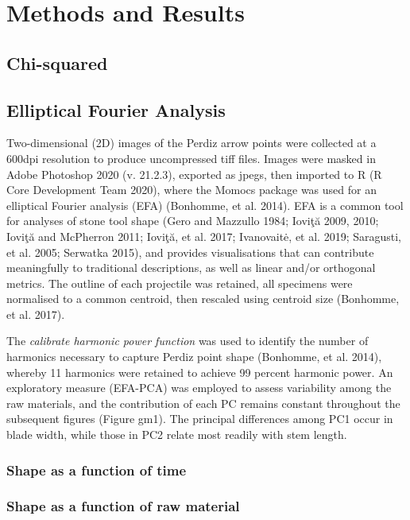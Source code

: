 \documentclass[review]{elsarticle}
\begin{document}
\section*{Methods and Results}

\subsection*{Chi-squared}

\subsection*{Elliptical Fourier Analysis}

Two-dimensional (2D) images of the Perdiz arrow points were collected at a 600dpi resolution to produce uncompressed tiff files. Images were masked in Adobe Photoshop 2020 (v. 21.2.3), exported as jpegs, then imported to R (R Core Development Team 2020), where the Momocs package was used for an elliptical Fourier analysis (EFA) (Bonhomme, et al. 2014). EFA is a common tool for analyses of stone tool shape (Gero and Mazzullo 1984; Ioviţă 2009, 2010; Ioviţă and McPherron 2011; Ioviţă, et al. 2017; Ivanovaitė, et al. 2019; Saragusti, et al. 2005; Serwatka 2015), and provides visualisations that can contribute meaningfully to traditional descriptions, as well as linear and/or orthogonal metrics. The outline of each projectile was retained, all specimens were normalised to a common centroid, then rescaled using centroid size (Bonhomme, et al. 2017). 

The \textit{calibrate harmonic power function} was used to identify the number of harmonics necessary to capture Perdiz point shape (Bonhomme, et al. 2014), whereby 11 harmonics were retained to achieve 99 percent harmonic power. An exploratory measure (EFA-PCA) was employed to assess variability among the raw materials, and the contribution of each PC remains constant throughout the subsequent figures (Figure gm1). The principal differences among PC1 occur in blade width, while those in PC2 relate most readily with stem length. 

\subsubsection*{Shape as a function of time}


\subsubsection*{Shape as a function of raw material}
\end{document}
